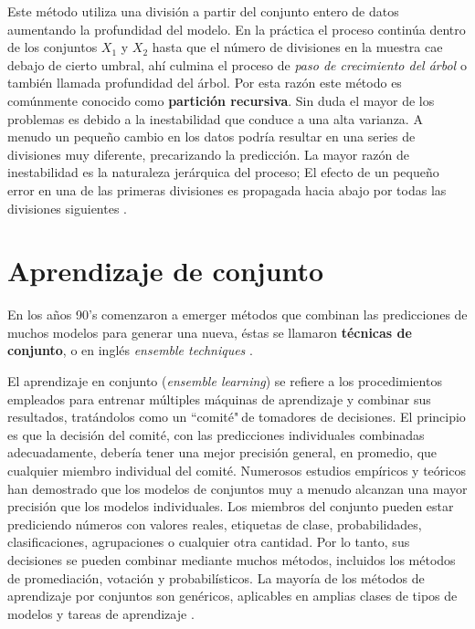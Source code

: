     Este método utiliza una división a partir del conjunto entero de datos aumentando la profundidad del modelo. En la práctica el proceso continúa
    dentro de los conjuntos $X_1$ y $X_2$ hasta que el número de divisiones en la muestra cae debajo de cierto umbral, ahí culmina el proceso de
    \textit{paso de crecimiento del árbol} \cite{18} o también llamada profundidad del árbol.
    Por esta razón este método es comúnmente conocido como \textbf{partición recursiva}. Sin duda el mayor de los problemas es debido a la inestabilidad que conduce a una alta varianza. 
    A menudo un pequeño cambio en los datos podría resultar en una series de divisiones muy diferente, precarizando la predicción. La mayor razón de inestabilidad es la naturaleza 
    jerárquica del proceso; El efecto de un pequeño error en una de las primeras divisiones es propagada hacia abajo por todas las divisiones siguientes \cite{13}.
%
%
%
%
\section{Aprendizaje de conjunto}
En los años 90's comenzaron a emerger métodos que combinan las predicciones de muchos modelos para generar una nueva, éstas se llamaron \textbf{técnicas de conjunto},
o en inglés \textit{ensemble techniques} \cite{18}.

El aprendizaje en conjunto (\textit{ensemble learning}) se refiere a los procedimientos empleados para entrenar múltiples máquinas de aprendizaje y combinar sus resultados, tratándolos como un ``comité"$~$de tomadores de decisiones. 
El principio es que la decisión del comité, con las predicciones individuales combinadas adecuadamente, debería tener una mejor precisión general, en promedio, que cualquier miembro individual del comité. 
Numerosos estudios empíricos y teóricos han demostrado que los modelos de conjuntos muy a menudo alcanzan una mayor precisión que los modelos individuales.
Los miembros del conjunto pueden estar prediciendo números con valores reales, etiquetas de clase, probabilidades, clasificaciones, agrupaciones o cualquier otra cantidad. Por lo tanto, 
sus decisiones se pueden combinar mediante muchos métodos, incluidos los métodos de promediación, votación y probabilísticos. La mayoría de los métodos de aprendizaje por conjuntos son genéricos, 
aplicables en amplias clases de tipos de modelos y tareas de aprendizaje \cite{6}.


